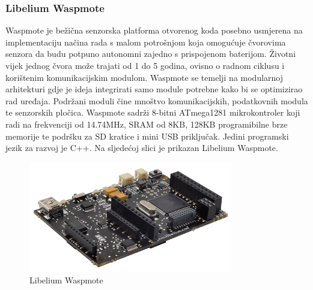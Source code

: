 \documentclass[times, utf8, diplomski]{fer}
\begin{document}
\subsubsection{Libelium Waspmote}
Waspmote\citep{Waspmote} je bežična senzorska platforma otvorenog koda posebno usmjerena na implementaciju načina rada s malom potrošnjom koja omogućuje čvorovima senzora da budu potpuno autonomni zajedno s prispojenom baterijom. Životni vijek jednog čvora može trajati od 1 do 5 godina, ovisno o radnom ciklusu i korištenim komunikacijskim modulom. Waspmote se temelji na modularnoj arhitekturi gdje je ideja integrirati samo module potrebne kako bi se optimizirao rad uređaja. Podržani moduli čine mnoštvo komunikacijskih, podatkovnih modula te senzorskih pločica. Waspmote sadrži 8-bitni ATmega1281 mikrokontroler koji radi na frekvenciji od 14.74MHz, SRAM od 8KB, 128KB programibilne brze memorije te podršku za SD kratice i mini USB priključak. Jedini programski jezik za razvoj je C++. Na sljedećoj slici je prikazan Libelium Waspmote.
\begin{figure}[htb]
    \centering
    \includegraphics[width=8.9cm]{images/waspmote.png}
    \caption{Libelium Waspmote\citep{Waspmote}}
    \label{fig:waspmote}
\end{figure}
\end{document}
